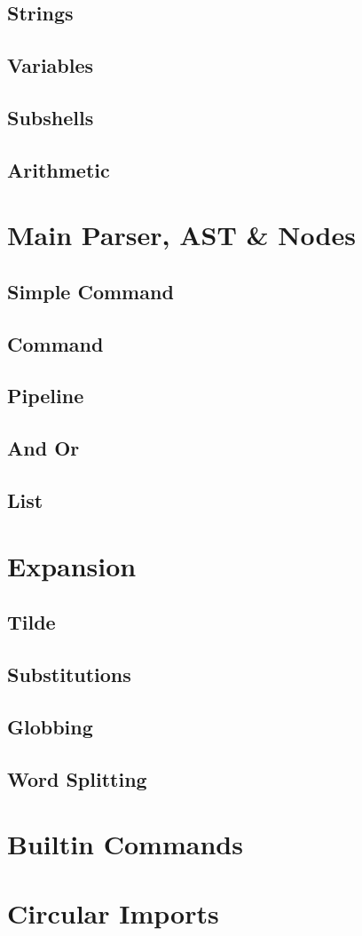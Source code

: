 \subsection{Strings}
\subsection{Variables}
\subsection{Subshells}
\subsection{Arithmetic}

\section{Main Parser, AST \& Nodes}

\subsection{Simple Command}
\subsection{Command}
\subsection{Pipeline}
\subsection{And Or}
\subsection{List}

\section{Expansion}

\subsection{Tilde}
\subsection{Substitutions}
\subsection{Globbing}
\subsection{Word Splitting}

\section{Builtin Commands}

\section{Circular Imports}




